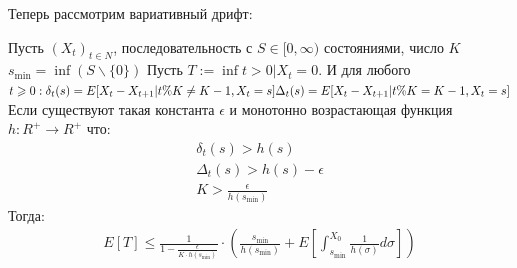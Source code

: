 \documentclass[times,specification,annotation]{itmo-student-thesis}
\begin{document}
    Теперь рассмотрим вариативный дрифт:

    \begin{theorem}
        \label{drift:var}
        Пусть $(X_t)_{t \in N}$, последовательность с $S \in [0, \infty)$ состояниями, число $K$
        $s_{\min} = \inf(S \backslash \{0\})$
        Пусть $T := \inf{t > 0 | X_t = 0}$.
        И для любого $t \geq 0 : \\
        \delta_t(s) = E[X_t - X_{t + 1}| t \% K \neq K - 1, X_t = s] \\
        \Delta_t(s) = E[X_t - X_{t + 1}| t \% K = K - 1, X_t = s]$ \\
        Если существуют такая константа $\epsilon$ и монотонно возрастающая функция $h : R^+ \rightarrow R^+$ что:
        \begin{gather*}
            \delta_t(s) > h(s) \\
            \Delta_t(s) > h(s) - \epsilon \\
            K > \frac{\epsilon}{h(s_{\min})}
        \end{gather*}
        Тогда:
        \begin{gather*}
            E[T] \leq \frac{1}{{1 - \frac{\epsilon}{K \cdot h(s_{\min})}}}  \cdot
            (\frac{s_{\min}}{h(s_{\min})} + E[\int_{s_{\min}}^{X_0}\frac{1}{h(\sigma)}d\sigma])
        \end{gather*}
    \end{theorem}
\end{document}
